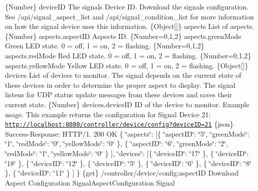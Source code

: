 \{Number\} device\+ID The signal\textquotesingle{}s Device ID.  Download the signal\textquotesingle{}s configuration. See /api/signal\+\_\+aspect\+\_\+list and /api/signal\+\_\+condition\+\_\+list for more information on how the signal device uses this information.  \{Object\mbox{[}\mbox{]}\} aspects List of aspects.  \{Number\} aspects.\+aspect\+ID Aspect\textquotesingle{}s ID.  \{Number=0,1,2\} aspects.\+green\+Mode Green L\+ED state. 0 = off, 1 = on, 2 = flashing.  \{Number=0,1,2\} aspects.\+red\+Mode Red L\+ED state. 0 = off, 1 = on, 2 = flashing.  \{Number=0,1,2\} aspects.\+yellow\+Mode Yellow L\+ED state. 0 = off, 1 = on, 2 = flashing.  \{Object\mbox{[}\mbox{]}\} devices List of devices to monitor. The signal depends on the current state of these devices in order to determine the proper aspect to display. The signal listens for U\+DP status update messages from these devices and saves their current state.  \{Number\} devices.\+device\+ID ID of the device to monitor.  Example usage. This example returns the configuration for Signal Device 21\+: \href{http://localhost:8080/controller/device/config?deviceID=21}{\tt http\+://localhost\+:8080/controller/device/config?device\+I\+D=21}  \{json\} Success-\/\+Response\+: H\+T\+T\+P/1. 200 OK \{ \char`\"{}aspects\char`\"{}\+: \mbox{[}\{ \char`\"{}aspect\+I\+D\char`\"{}\+: \char`\"{}5\char`\"{}, \char`\"{}green\+Mode\char`\"{}\+: \char`\"{}1\char`\"{}, \char`\"{}red\+Mode\char`\"{}\+: \char`\"{}0\char`\"{}, \char`\"{}yellow\+Mode\char`\"{}\+: \char`\"{}0\char`\"{} \}, \{ \char`\"{}aspect\+I\+D\char`\"{}\+: \char`\"{}6\char`\"{}, \char`\"{}green\+Mode\char`\"{}\+: \char`\"{}2\char`\"{}, \char`\"{}red\+Mode\char`\"{}\+: \char`\"{}1\char`\"{}, \char`\"{}yellow\+Mode\char`\"{}\+: \char`\"{}0\char`\"{} \} \mbox{]}, \char`\"{}devices\char`\"{}\+: \mbox{[}\{ \char`\"{}device\+I\+D\char`\"{}\+: \char`\"{}17\char`\"{} \}, \{ \char`\"{}device\+I\+D\char`\"{}\+: \char`\"{}18\char`\"{} \}, \{ \char`\"{}device\+I\+D\char`\"{}\+: \char`\"{}12\char`\"{} \}, \{ \char`\"{}device\+I\+D\char`\"{}\+: \char`\"{}5\char`\"{} \}, \{ \char`\"{}device\+I\+D\char`\"{}\+: \char`\"{}6\char`\"{} \}, \{ \char`\"{}device\+I\+D\char`\"{}\+: \char`\"{}8\char`\"{} \}, \{ \char`\"{}device\+I\+D\char`\"{}\+: \char`\"{}11\char`\"{} \} \mbox{]} \}  \{get\} /controller/device/config\+:aspect\+ID Download Aspect Configuration  Signal\+Aspect\+Configuration  Signal

